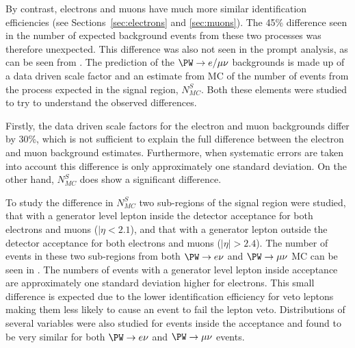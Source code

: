 By contrast, electrons and muons have much more similar identification efficiencies (see Sections~\ref{sec:electrons} and \ref{sec:muons}). The 45\% difference seen in the number of expected background events from these two processes was therefore unexpected. This difference was also not seen in the prompt analysis, as can be seen from . The prediction of the $\PW\rightarrow e/\mu\nu$ backgrounds is made up of a data driven scale factor and an estimate from \ac{MC} of the number of events from the process expected in the signal region, $N_{MC}^{S}$. Both these elements were studied to try to understand the observed differences.

Firstly, the data driven scale factors for the electron and muon backgrounds differ by 30\%, which is not sufficient to explain the full difference between the electron and muon background estimates. Furthermore, when systematic errors are taken into account this difference is only approximately one standard deviation. On the other hand, $N_{MC}^{S}$ does show a significant difference.

To study the difference in $N_{MC}^{S}$ two sub-regions of the signal region were studied, that with a generator level lepton inside the detector acceptance for both electrons and muons ($|\eta<2.1$), and that with a generator lepton outside the detector acceptance for both electrons and muons ($|\eta|>2.4$). The number of events in these two sub-regions from both $\PW\rightarrow e\nu$ and $\PW\rightarrow\mu\nu$ \ac{MC} can be seen in . The numbers of events with a generator level lepton inside acceptance are approximately one standard deviation higher for electrons. This small difference is expected due to the lower identification efficiency for veto leptons making them less likely to cause an event to fail the lepton veto. Distributions of several variables were also studied for events inside the acceptance and found to be very similar for both $\PW\rightarrow e\nu$ and $\PW\rightarrow\mu\nu$ events.

